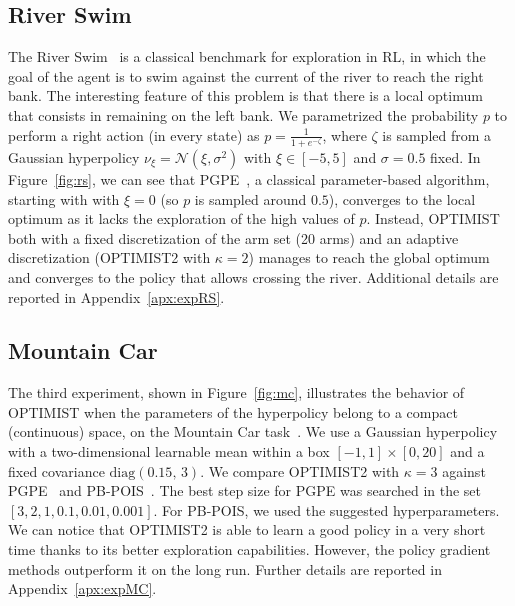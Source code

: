 \documentclass{article}
\makeatletter
\DeclareRobustCommand{\algoname}{OPTIMIST\@\xspace}
\makeatother
\begin{document}
\subsection{River Swim}
The River Swim~\cite{strehl2008analysis} is a classical benchmark for exploration in RL, in which the goal of the agent is to swim against the current of the river to reach the right bank. The interesting feature of this problem is that there is a local optimum that consists in remaining on the left bank. We parametrized the probability $p$ to perform a right action (in every state) as $p = \frac{1}{1+e^{-\zeta}}$, where $\zeta$ is sampled from a Gaussian hyperpolicy $\nu_{\xi} = \mathcal{N}(\xi, \sigma^2)$ with $\xi \in [-5,5]$ and $\sigma=0.5$ fixed. In Figure~\ref{fig:rs}, we can see that PGPE~\citep{sehnke2008policy}, a classical parameter-based algorithm, starting with with $\xi = 0$ (so $p$ is sampled around $0.5$), converges to the local optimum as it lacks the exploration of the high values of $p$. Instead, OPTIMIST both with a fixed discretization of the arm set (20 arms) and an adaptive discretization (OPTIMIST2 with $\kappa=2$) manages to reach the global optimum and converges to the policy that allows crossing the river. Additional details are reported in Appendix~\ref{apx:expRS}.

\subsection{Mountain Car}
The third experiment, shown in Figure~\ref{fig:mc}, illustrates the behavior of \algoname  
when the parameters of the hyperpolicy belong to a compact (continuous) space, on the Mountain Car task~\citep{brockman2016openai}. We use a Gaussian hyperpolicy with a two-dimensional learnable mean within a box $[-1,1]\times[0,20]$ and a fixed covariance $\mathrm{diag}(0.15,\,3)$. We compare OPTIMIST2 with $\kappa=3$ against PGPE~\citep{sehnke2008policy} and PB-POIS~\cite{metelli2018policy}. The best step size for PGPE was searched in the set $[3, 2, 1, 0.1, 0.01, 0.001]$. For PB-POIS, we used the suggested hyperparameters. We can notice that OPTIMIST2 is able to learn a good policy in a very short time thanks to its better exploration capabilities. However, the policy gradient methods outperform it on the long run. Further details are reported in Appendix~\ref{apx:expMC}.
\end{document}
